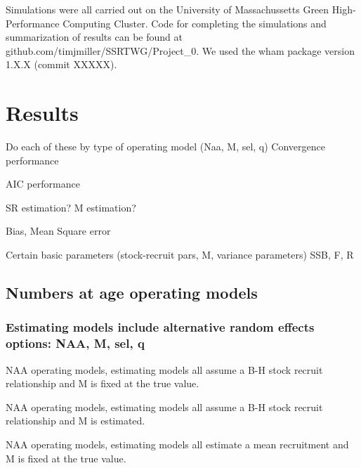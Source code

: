 \documentclass[
  12pt,
]{article}
\begin{document}
Simulations were all carried out on the University of Massachussetts
Green High-Performance Computing Cluster. Code for completing the
simulations and summarization of results can be found at
github.com/timjmiller/SSRTWG/Project\_0. We used the wham package
version 1.X.X (commit XXXXX).

\hypertarget{results}{%
\section{Results}\label{results}}

Do each of these by type of operating model (Naa, M, sel, q) Convergence
performance

AIC performance

SR estimation? M estimation?

Bias, Mean Square error

Certain basic parameters (stock-recruit pars, M, variance parameters)
SSB, F, R

\clearpage

\hypertarget{numbers-at-age-operating-models}{%
\subsection{Numbers at age operating
models}\label{numbers-at-age-operating-models}}

\hypertarget{estimating-models-include-alternative-random-effects-options-naa-m-sel-q}{%
\subsubsection{Estimating models include alternative random effects
options: NAA, M, sel,
q}\label{estimating-models-include-alternative-random-effects-options-naa-m-sel-q}}

\clearpage

\begin{table}
\caption{NAA operating models, estimating models all assume a B-H stock recruit relationship and M is fixed at the true value.}
{}
\end{table}

\begin{table}
\caption{NAA operating models, estimating models all assume a B-H stock recruit relationship and M is estimated.}
{}
\end{table}

\begin{table}
\caption{NAA operating models, estimating models all estimate a mean recruitment and M is fixed at the true value.}
{}
\end{table}
\end{document}
